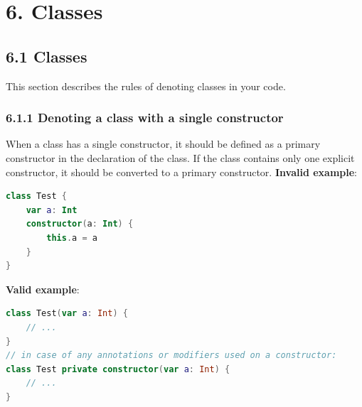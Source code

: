 \section*{\textbf{6. Classes}}
\label{sec:6.}
\subsection*{\textbf{6.1 Classes}}
\label{sec:6.1}
This section describes the rules of denoting classes in your code.
\subsubsection*{\textbf{6.1.1  Denoting a class with a single constructor}}
\leavevmode\newline
\label{sec:6.1.1}
When a class has a single constructor, it should be defined as a primary constructor in the declaration of the class. If the class contains only one explicit constructor, it should be converted to a primary constructor.
\textbf{Invalid example}:
\begin{lstlisting}[language=Kotlin]
class Test {
    var a: Int
    constructor(a: Int) {
        this.a = a
    }
}
\end{lstlisting}
\textbf{Valid example}:
\begin{lstlisting}[language=Kotlin]
class Test(var a: Int) {
    // ...
}
// in case of any annotations or modifiers used on a constructor:
class Test private constructor(var a: Int) {
    // ...
}
\end{lstlisting}
